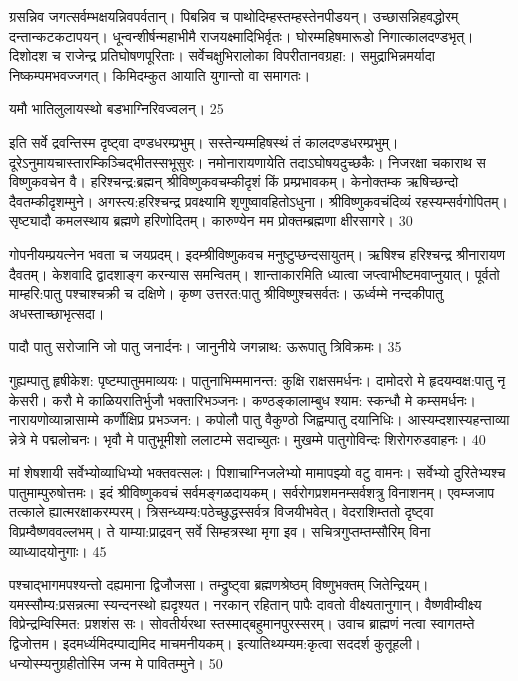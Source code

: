 ग्रसन्निव जगत्सर्वम्भक्षयन्निवपर्वतान्।
पिबन्निव च पाथोदिम्हस्तम्हस्तेनपीडयन्।
उच्छासन्निहवद्धोरम् दन्तान्कटकटापयन्।
धून्वन्शीर्षन्महाभीमै राजयक्ष्मादिभिर्वृतः।
घोरम्महिषमारूडो निगात्कालदण्डभृत्।
दिशोदश च राजेन्द्र प्रतिघोषणपूरिताः।
सर्वेचक्षुभिरालोका विपरीतानवग्रहा:।
समुद्राभिन्नमर्यादा निष्कम्पमभवज्जगत्।
किमिदम्कुत आयाति युगान्तो वा समागतः।


यमौ भातिलुलायस्थो बडभाग्निरिवज्वलन्।
25

इति सर्वे द्रवन्तिस्म दृष्ट्वा दण्डधरम्प्रभुम्।
सस्तेन्यम्महिषस्थं तं कालदण्डधरम्प्रभुम्।
दूरेऽनुमायचास्तारम्किञ्चिद्भीतस्सभूसुरः।
नमोनारायणायेति तदाऽघोषयदुच्छकैः।
निजरक्षा चकाराथ स विष्णुकवचेन वै।
हरिश्चन्द्र:ब्रह्मन् श्रीविष्णुकवचम्कीदृशं किं प्रम्प्रभावकम्।
केनोक्तम्क ऋषिच्छन्दो दैवतम्कीदृशम्मुने।
अगस्त्य:हरिश्चन्द्र प्रवक्ष्यामि शृणुष्वावहितोऽधुना।
श्रीविष्णुकवचंदिव्यं रहस्यम्सर्वगोपितम्।
सृष्ट्यादौ कमलस्थाय ब्रह्मणे हरिणोदितम्।
कारुण्येन मम प्रोक्तम्ब्रह्मणा क्षीरसागरे।
30

गोपनीयम्प्रयत्नेन भवता च जयप्रदम्।
इदम्श्रीविष्णुकवच मनुष्टुप्छन्दसायुतम्।
ऋषिश्च हरिश्चन्द्र श्रीनारायण दैवतम्।
केशवादि द्वादशाङ्ग करन्यास समन्वितम्।
शान्ताकारमिति ध्यात्वा जप्त्वाभीष्टमवाप्नुयात्।
पूर्वतो माम्हरि:पातु पश्चाश्चक्री च दक्षिणे।
कृष्ण उत्तरत:पातु श्रीविष्णुश्चसर्वतः।
ऊर्ध्वम्मे नन्दकीपातु अधस्ताच्छाभृत्सदा।

पादौ पातु सरोजानि जो पातु जनार्दनः।
जानुनीये जगन्नाथ: ऊरूपातु त्रिविक्रमः।
35

गुह्यम्पातु हृषीकेश: पृष्टम्पातुममाव्ययः।
पातुनाभिम्ममानन्त: कुक्षि राक्षसमर्धनः।
दामोदरो मे हृदयम्वक्ष:पातु नृ केसरी।
करौ मे काळियरातिर्भुजौ भक्तारिभञ्जनः।
कण्ठङ्कालाम्बुध श्याम: स्कन्धौ मे कम्समर्धनः।
नारायणोव्यान्नासाम्मे कर्णौक्षिप्र प्रभञ्जन:।
कपोलौ पातु वैकुण्ठो जिह्वम्पातु दयानिधिः।
आस्यम्दशास्यहन्ताव्या न्नेत्रे मे पद्मलोचनः।
भृवौ मे पातुभूमीशो ललाटम्मे सदाच्युतः।
मुखम्मे पातुगोविन्दः शिरोगरुडवाहनः।
40

मां शेषशायी सर्वेभ्योव्याधिभ्यो भक्तवत्सलः।
पिशाचाग्निजलेभ्यो मामापझ्यो वटु वामनः।
सर्वेभ्यो दुरितेभ्यश्च पातुमाम्पुरुषोत्तमः।
इदं श्रीविष्णुकवचं सर्वमङ्गळदायकम्।
सर्वरोगप्रशमनम्सर्वशत्रु विनाशनम्।
एवम्जजाप तत्काले ह्यात्मरक्षाकरम्परम्।
त्रिसन्ध्यम्य:पठेच्छुद्धस्सर्वत्र विजयीभवेत्।
वेदराशिम्ततो दृष्ट्वा विप्रम्वैष्णववल्लभम्।
ते याम्या:प्राद्रवन् सर्वे सिम्हत्रस्था मृगा इव।
सचित्रगुप्तम्तम्सौरिम् विना व्याध्यादयोनुगाः।
45


पश्चाद्भागमपश्यन्तो दह्यमाना द्विजौजसा।
तम्द्रुष्ट्वा ब्रह्मणश्रेष्ठम् विष्णुभक्तम् जितेन्द्रियम्।
यमस्सौम्य:प्रसन्नत्मा स्यन्दनस्थो ह्यदृश्यत।
नरकान् रहितान् पापैः दावतो वीक्ष्यतानुगान्।
वैष्णवीम्वीक्ष्य विप्रेन्द्रम्विस्मित: प्रशशंस सः।
सोवतीर्यरथा स्तस्माद्बहुमानपुरस्सरम्।
उवाच ब्राह्मणं नत्वा स्वागतम्ते द्विजोत्तम।
इदमर्ध्यमिदम्पाद्यमिद माचमनीयकम्।
इत्यातिथ्यम्यम:कृत्वा सददर्श कुतूहली।
धन्योस्म्यनुग्रहीतोस्मि जन्म मे पावितम्मुने।
50

